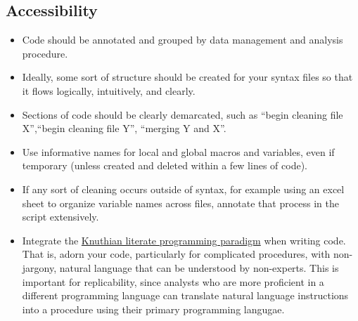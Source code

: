 \documentclass[11pt]{article}
\begin{document}
\subsection{Accessibility}
\begin{itemize}
	\item Code should be annotated and grouped by data management and analysis procedure.
	\item Ideally, some sort of structure should be created for your syntax files so that it flows logically, intuitively, and clearly.
	\item Sections of code should be clearly demarcated, such as ``begin cleaning file X'',``begin cleaning file Y'', ``merging Y and X''.
	\item Use informative names for local and global macros and variables, even if temporary (unless created and deleted within a few lines of code).
	\item If any sort of cleaning occurs outside of syntax, for example using an excel sheet to organize variable names across files, annotate that process in the script extensively.
	\item Integrate the \href{https://en.wikipedia.org/wiki/Literate\_programming}{Knuthian literate programming paradigm} when writing code. That is, adorn your code, particularly for complicated procedures, with non-jargony, natural language that can be understood by non-experts. This is important for replicability, since analysts who are more proficient in a different programming language can translate natural language instructions into a procedure using their primary programming langugae.
\end{itemize}
\end{document}
